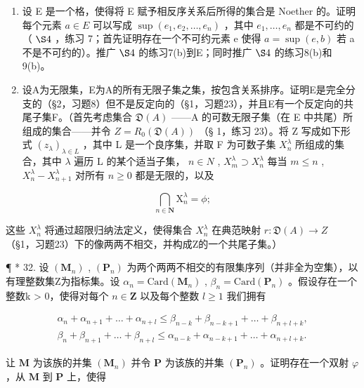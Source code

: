 \begin{enumerate}
\def\labelenumi{\arabic{enumi}.}
\setcounter{enumi}{29}
\item
  设 E 是一个格，使得将 E 赋予相反序关系后所得的集合是 Noether 的。证明每个元素 \(a \in E\) 可以写成 \(\sup (e_1, e_2, \ldots, e_n)\) ，其中 \(e_1, \ldots, e_n\) 都是不可约的（ \(\S 4\) ，练习 7；首先证明存在一个不可约元素 e 使得 \(a = \sup (e, b)\) 若 a 不是不可约的）。推广 \(\S 4\) 的练习7(b)到E；同时推广 \(\S 4\) 的练习8(b)和9(b)。
\item
  设A为无限集，E为A的所有无限子集之集，按包含关系排序。证明E是完全分支的（§2，习题8）但不是反定向的（§1，习题23），并且E有一个反定向的共尾子集F。（首先考虑集合 \(\mathfrak{D}(A)\) ——A 的可数无限子集（在 E 中共尾）所组成的集合——并令 \(Z = R_0(\mathfrak{D}(A))\) （§ 1，练习 23）。将 Z 写成如下形式 \((z_{\lambda})_{\lambda \in L}\) ，其中 L 是一个良序集，并取 F 为可数子集 \(X_n^{\lambda}\) 所组成的集合，其中 \(\lambda\) 遍历 L 的某个适当子集， \(n \in N\) , \(X_m^{\lambda} \supset X_n^{\lambda}\) 每当 \(m \leqslant n\) , \(X_n^{\lambda} - X_{n+1}^{\lambda}\) 对所有 \(n \geqslant 0\) 都是无限的，以及
\end{enumerate}

\[
\bigcap_ {n \in \mathbf {N}} \mathrm{X} _ {n} ^ {\lambda} = \phi ;
\]

这些 \(X_{n}^{\lambda}\) 将通过超限归纳法定义，使得集合 \(X_{n}^{\lambda}\) 在典范映射 \(r: \mathfrak{D}(A) \to Z\) （§1，习题23）下的像两两不相交，并构成Z的一个共尾子集。）

¶ * 32. 设 \((\mathbf{M}_n)\) , \((\mathbf{P}_n)\) 为两个两两不相交的有限集序列（并非全为空集），以有理整数集Z为指标集。设 \(\alpha_n = \text{Card}(\mathbf{M}_n)\) , \(\beta_n = \text{Card}(\mathbf{P}_n)\) 。假设存在一个整数k \textgreater{} 0，使得对每个 \(n \in \mathbf{Z}\) 以及每个整数 \(l \geqslant 1\) 我们拥有

\[
\begin{array}{l} \alpha_ {n} + \alpha_ {n + 1} + \dots + \alpha_ {n + l} \leqslant \beta_ {n - k} + \beta_ {n - k + 1} + \dots + \beta_ {n + l + k}, \\ \beta_ {n} + \beta_ {n + 1} + \dots + \beta_ {n + l} \leqslant \alpha_ {n - k} + \alpha_ {n - k + 1} + \dots + \alpha_ {n + l + k}. \end{array}
\]

让 \(\mathbf{M}\) 为该族的并集 \((\mathbf{M}_n)\) 并令 \(\mathbf{P}\) 为该族的并集 \((\mathbf{P}_n)\) 。证明存在一个双射 \(\varphi\) ，从 \(\mathbf{M}\) 到 \(\mathbf{P}\) 上，使得

